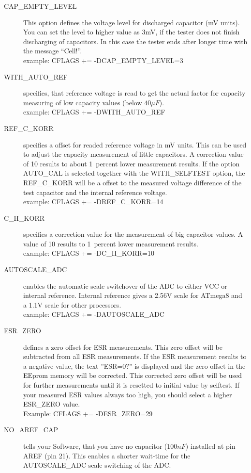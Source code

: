 \begin{description}
  \item[CAP\_EMPTY\_LEVEL]  This option defines the voltage level for discharged capacitor (mV units).
You can set the level to higher value as 3mV, if the tester does not finish discharging of capacitors.
In this case the tester ends after longer time with the message ``Cell!''.\\
example: CFLAGS += -DCAP\_EMPTY\_LEVEL=3
  \item[WITH\_AUTO\_REF] specifies, that reference voltage is read to get the actual factor for capacity measuring of low capacity values (below \(40\mu F\)).\\
example:  CFLAGS += -DWITH\_AUTO\_REF
  \item[REF\_C\_KORR] specifies a offset for readed reference voltage in mV units.
This can be used to adjust the capacity measurement of little capacitors.
A correction value of 10 results to about 1~percent lower measurement results.
If the option AUTO\_CAL is selected together with the WITH\_SELFTEST option, the REF\_C\_KORR will be
a offset to the measured voltage difference of the test capacitor and the internal reference voltage.\\
example:  CFLAGS += -DREF\_C\_KORR=14
  \item[C\_H\_KORR] specifies a correction value for the measurement of big capacitor values.
A value of 10 results to 1~percent lower measurement results.\\
example:  CFLAGS += -DC\_H\_KORR=10
  \item[AUTOSCALE\_ADC] enables the automatic scale switchover of the ADC to either VCC or internal reference.
Internal reference gives a 2.56V scale for ATmega8 and a 1.1V scale for other processors.\\
example: CFLAGS += -DAUTOSCALE\_ADC
  \item[ESR\_ZERO] defines a zero offset for ESR measurements.
This zero offset will be subtracted from all ESR measurements.
If the ESR measurement results to a negative value, the text ''ESR=0?'' is displayed and the zero offset
in the EEprom memory will be corrected.
This corrected zero offset will be used for further measurements until it is resetted to initial value by selftest.
If your measured ESR values always too high, you should select a higher ESR\_ZERO value.\\
Example: CFLAGS += -DESR\_ZERO=29
  \item[NO\_AREF\_CAP] tells your Software, that you have no capacitor (\(100 nF\)) installed at pin AREF (pin 21).
This enables a shorter wait-time for the AUTOSCALE\_ADC scale switching of the ADC.

\end{description}
